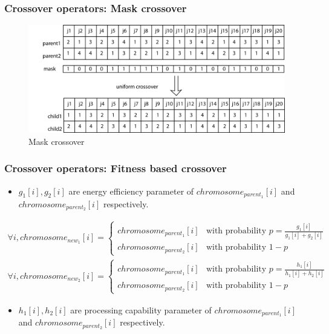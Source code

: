 \documentclass{beamer}
\begin{document}
\begin{frame}
\frametitle{Crossover operators: Mask crossover}
\begin{figure}[!h]
    \includegraphics[width=\textwidth]{imgs/crossover3}
    \caption{Mask crossover}
\end{figure}
\end{frame}
\begin{frame}
 \frametitle{Crossover operators: Fitness based crossover}
{\small
\begin{itemize}
\item $g_1[i], g_2[i]$ are energy efficiency parameter of $chromosome_{parent_1}[i]$ and $chromosome_{parent_2}[i]$ respectively.
\end{itemize}
}
{\tiny
\begin{align}
\forall i, chromosome_{new_1}[i] = \left\{ \begin{array}{rl}
 chromosome_{parent_1}[i] &\mbox{with probability $p = \frac{g_1[i]}{g_1[i] +g_2[i]}$} \\
 chromosome_{parent_2}[i] &\mbox{with probability $1-p$}
       \end{array} \right.
\end{align}
}
{\tiny
\begin{align}
\forall i, chromosome_{new_2}[i] = \left\{ \begin{array}{rl}
 chromosome_{parent_1}[i] &\mbox{with probability $p = \frac{h_1[i]}{h_1[i] +h_2[i]}$} \\
 chromosome_{parent_2}[i] &\mbox{with probability $1-p$}
       \end{array} \right.
\end{align}
}
{\small
\begin{itemize}
\item $h_1[i], h_2[i]$ are processing capability parameter of $chromosome_{parent_1}[i]$ and $chromosome_{parent_2}[i]$ respectively.
\end{itemize}
}
\end{frame}
\end{document}

